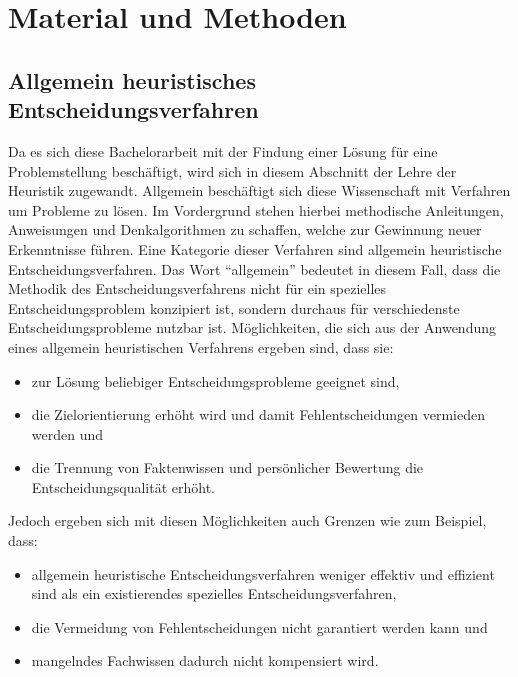 \newpage
\section{Material und Methoden}
\label{sec:durchführung}
\subsection{Allgemein heuristisches Entscheidungsverfahren}
Da es sich diese Bachelorarbeit mit der Findung einer Lösung für eine Problemstellung beschäftigt, wird sich in diesem Abschnitt der Lehre der Heuristik zugewandt. Allgemein beschäftigt sich diese Wissenschaft mit Verfahren um Probleme zu lösen. Im Vordergrund stehen hierbei methodische Anleitungen, Anweisungen und Denkalgorithmen zu schaffen, welche zur Gewinnung neuer Erkenntnisse führen. \cite{Duden.10.02.2022} \linebreak Eine Kategorie dieser Verfahren sind allgemein heuristische Entscheidungsverfahren. Das Wort "`allgemein"' bedeutet in diesem Fall, dass die Methodik des Entscheidungsverfahrens nicht für ein spezielles Entscheidungsproblem konzipiert ist, sondern durchaus für verschiedenste Entscheidungsprobleme nutzbar ist. 
Möglichkeiten, die sich aus der Anwendung eines allgemein heuristischen Verfahrens ergeben sind, dass sie:
\begin{itemize}
	\item zur Lösung beliebiger Entscheidungsprobleme geeignet sind,
	\item die Zielorientierung erhöht wird und damit Fehlentscheidungen vermieden werden und
	\item die Trennung von Faktenwissen und persönlicher Bewertung die Entscheidungsqualität erhöht.
\end{itemize}
Jedoch ergeben sich mit diesen Möglichkeiten auch Grenzen wie zum Beispiel, dass:
\begin{itemize}
	\item allgemein heuristische Entscheidungsverfahren weniger effektiv und effizient sind als ein existierendes spezielles Entscheidungsverfahren,
	\item die Vermeidung von Fehlentscheidungen nicht garantiert werden kann und
	\item mangelndes Fachwissen dadurch nicht kompensiert wird.
\end{itemize}

